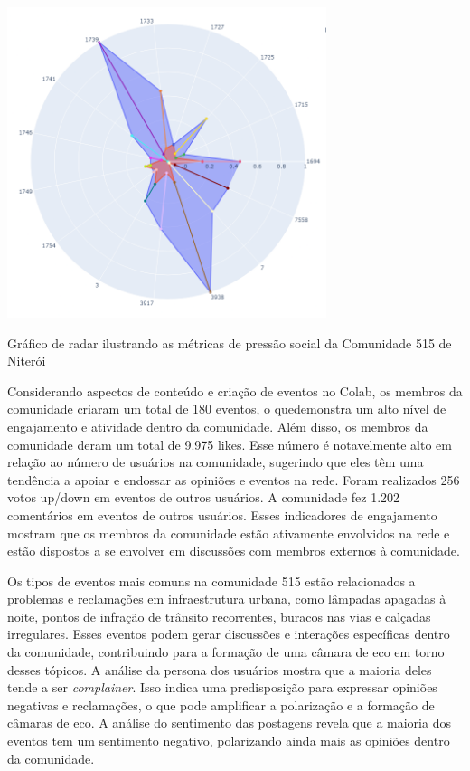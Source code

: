 \begin{quadro}[htb]
	\centering
	\includegraphics[width=0.7\textwidth]{images/niteroi_community_515.png}
	\caption{Gráfico de radar ilustrando as métricas de pressão social da Comunidade 515 de Niterói}
	\label{fig:niteroi_community_515}
\end{quadro}

Considerando aspectos de conteúdo e criação de eventos no Colab, os membros da comunidade criaram um total de 180 eventos, o quedemonstra um alto nível de engajamento e atividade dentro da comunidade. Além disso, os membros da comunidade deram um total de 9.975 likes. Esse número é notavelmente alto em relação ao número de usuários na comunidade, sugerindo que eles têm uma tendência a apoiar e endossar as opiniões e eventos na rede. Foram realizados 256 votos up/down em eventos de outros usuários. A comunidade fez 1.202 comentários em eventos de outros usuários. Esses indicadores de engajamento mostram que os membros da comunidade estão ativamente envolvidos na rede e estão dispostos a se envolver em discussões com membros externos à comunidade.

Os tipos de eventos mais comuns na comunidade 515 estão relacionados a problemas e reclamações em infraestrutura urbana, como lâmpadas apagadas à noite, pontos de infração de trânsito recorrentes, buracos nas vias e calçadas irregulares. Esses eventos podem gerar discussões e interações específicas dentro da comunidade, contribuindo para a formação de uma câmara de eco em torno desses tópicos. A análise da persona dos usuários mostra que a maioria deles tende a ser \textit{complainer}. Isso indica uma predisposição para expressar opiniões negativas e reclamações, o que pode amplificar a polarização e a formação de câmaras de eco. A análise do sentimento das postagens revela que a maioria dos eventos tem um sentimento negativo, polarizando ainda mais as opiniões dentro da comunidade.

